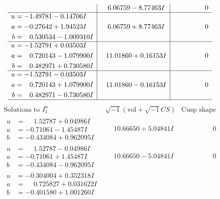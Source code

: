 \documentclass[1p]{elsarticle_modified}
\theoremstyle{definition}
\newcommand{\I}{\sqrt{-1}}
\begin{document}
$$\begin{array}{c|c|c}
 & \phantom{-}6.06759 - 8.77463 I & \phantom{-0.000000 } 0 \\ \hline\begin{aligned}
u &= -1.49781 - 0.14706 I \\
a &= -0.27642 + 1.94523 I \\
b &= \phantom{-}0.530534 - 1.009310 I\end{aligned}
 & \phantom{-}6.06759 + 8.77463 I & \phantom{-0.000000 } 0 \\ \hline\begin{aligned}
u &= -1.52791 + 0.03503 I \\
a &= \phantom{-}0.720143 - 1.079900 I \\
b &= \phantom{-}0.482971 + 0.730580 I\end{aligned}
 & \phantom{-}11.01860 + 0.16153 I & \phantom{-0.000000 } 0 \\ \hline\begin{aligned}
u &= -1.52791 - 0.03503 I \\
a &= \phantom{-}0.720143 + 1.079900 I \\
b &= \phantom{-}0.482971 - 0.730580 I\end{aligned}
 & \phantom{-}11.01860 - 0.16153 I & \phantom{-0.000000 } 0\\
 \hline 
 \end{array}$$\newpage$$\begin{array}{c|c|c}  
\text{Solutions to }I^u_{1}& \I (\text{vol} + \sqrt{-1}CS) & \text{Cusp shape}\\
 \hline 
\begin{aligned}
u &= \phantom{-}1.52787 + 0.04986 I \\
a &= -0.71061 - 1.45487 I \\
b &= -0.434084 + 0.962095 I\end{aligned}
 & \phantom{-}10.66650 + 5.04841 I & \phantom{-0.000000 } 0 \\ \hline\begin{aligned}
u &= \phantom{-}1.52787 - 0.04986 I \\
a &= -0.71061 + 1.45487 I \\
b &= -0.434084 - 0.962095 I\end{aligned}
 & \phantom{-}10.66650 - 5.04841 I & \phantom{-0.000000 } 0 \\ \hline\begin{aligned}
u &= -0.304004 + 0.352318 I \\
a &= \phantom{-}0.725827 + 0.031622 I \\
b &= -0.401580 + 1.001260 I\end{aligned}

\end{array}$$
\end{document}

